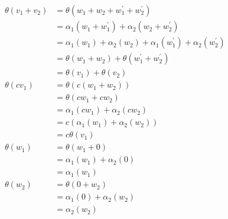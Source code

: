 \begin{solution}
\begin{align*}
\theta(v_1 + v_2) &= \theta(w_1+w_2+w_1^{\prime}+w_2^{\prime}) \\
                  &= \alpha_1(w_1 + w_1^{\prime}) + \alpha_2(w_2 + w_2^{\prime}) \\
                  &= \alpha_1(w_1) + \alpha_2(w_2) + \alpha_1(w_1^{\prime}) + \alpha_2(w_2^{\prime})\\
                  &= \theta(w_1 + w_2) + \theta(w_1^{\prime} + w_2^{\prime})\\
                  &= \theta(v_1) + \theta(v_2) \\[0.3cm]
\theta(cv_1)      &= \theta(c(w_1+w_2))\\
                  &= \theta(cw_1 + cw_2)\\
                  &= \alpha_1(cw_1) + \alpha_2(cw_2)\\
                  &= c(\alpha_1(w_1) + \alpha_2(w_2))\\
                  &= c\theta(v_1)\\[0.3cm]
\theta(w_1)       &= \theta(w_1 + 0)\\
                  &= \alpha_1(w_1) + \alpha_2(0)\\
                  &= \alpha_1(w_1)\\[0.3cm]
\theta(w_2)       &= \theta(0+w_2)\\
                  &= \alpha_1(0) + \alpha_2(w_2)\\
                  &= \alpha_2(w_2)
\end{align*}
\end{solution}

\probskip

